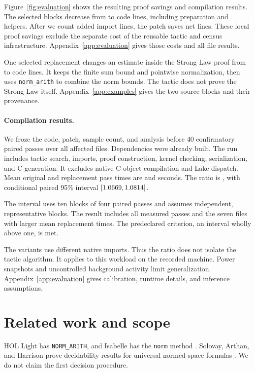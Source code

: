 \documentclass{article}
\newcommand{\NA}{\texttt{norm\_arith}}
\begin{document}
Figure~\ref{fig:evaluation} shows the resulting proof savings and compilation results.
The selected blocks decrease from \PatchBefore{} to \PatchAfter{} code lines, including preparation and helpers.
After we count \PatchImports{} added import lines, the patch saves \PatchNetSaved{} net lines.
These local proof savings exclude the separate cost of the reusable tactic and census infrastructure.
Appendix~\ref{app:evaluation} gives those costs and all file results.



One selected replacement changes an estimate inside the Strong Law proof from \CaseBefore{} to \CaseAfter{} code lines.
It keeps the finite sum bound and pointwise normalization, then uses \NA{} to combine the norm bounds.
The tactic does not prove the Strong Law itself.
Appendix~\ref{app:examples} gives the two source blocks and their provenance.

\paragraph{Compilation results.}
We froze the code, patch, sample count, and analysis before 40 confirmatory paired passes over all \PatchFiles{} affected files.
Dependencies were already built.
The run includes tactic search, imports, proof construction, kernel checking, serialization, and C generation.
It excludes native C object compilation and Lake dispatch.
Mean original and replacement pass times are \StudyOriginal{} and \StudyReplacement{} seconds.
The ratio is \StudyRatio{}, with conditional paired 95\% interval $[1.0669{},1.0814{}]$.

The interval uses ten blocks of four paired passes and assumes independent, representative blocks.
The result includes all measured passes and the seven files with larger mean replacement times.
The predeclared criterion, an interval wholly above one, is met.

The variants use different native imports.
Thus the ratio does not isolate the tactic algorithm.
It applies to this workload on the recorded machine.
Power snapshots and uncontrolled background activity limit generalization.
Appendix~\ref{app:evaluation} gives calibration, runtime details, and inference assumptions.

\section{Related work and scope}
HOL Light has \texttt{NORM\_ARITH}, and Isabelle has the \texttt{norm} method \citep{hollightnorm,isabellenorm}.
Solovay, Arthan, and Harrison prove decidability results for universal normed-space formulas \citep{solovay2012}.
We do not claim the first decision procedure.
\end{document}
